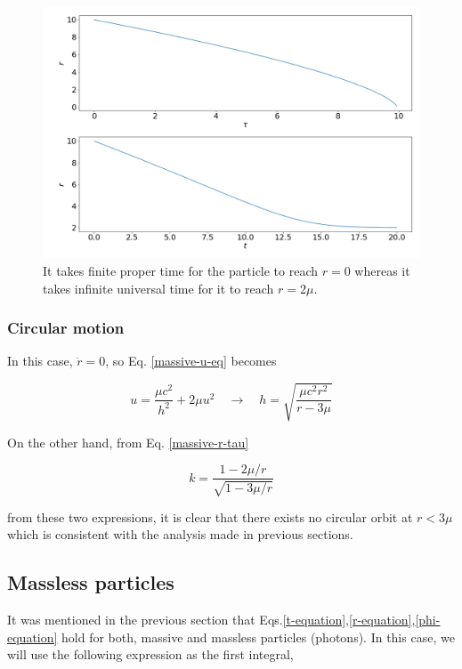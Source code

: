 \documentclass[letterpaper,11pt,onecolumn]{article}
\begin{document}
\begin{figure}[h!]
    \centering
    \includegraphics[width=0.8\linewidth]{Report/Images/2_radial_motion.png}
    \caption{It takes finite proper time for the particle to reach $r=0$ whereas it takes infinite universal time for it to reach $r = 2\mu$.}
    \label{fig:massive-ff}
\end{figure}


\subsubsection{Circular motion}


In this case, $\dot{r} = 0$, so Eq. \ref{massive-u-eq} becomes

\begin{equation}
    u = \frac{\mu c^2}{h^2} + 2 \mu u^2 \quad \longrightarrow \quad h = \sqrt{\frac{\mu c^2 r^2}{r-3 \mu}} 
\end{equation}
 
On the other hand, from Eq. \ref{massive-r-tau}

\begin{equation}
    k = \frac{1-2\mu/r}{\sqrt{1-3\mu/r}}
\end{equation}
 
 from these two expressions, it is clear that there exists no circular orbit at $r<3\mu$ which is consistent with the analysis made in previous sections. 
 
\subsection{Massless particles} \label{massless}

It was mentioned in the previous section that Eqs.\ref{t-equation},\ref{r-equation},\ref{phi-equation} hold for both, massive and massless particles (photons). In this case, we will use the following expression as the first integral,
\end{document}
